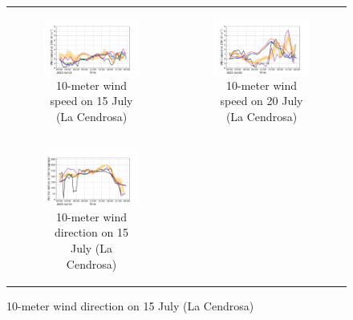 \begin{figure}[hbtp]
\begin{tabular}{cc}
        \begin{subfigure}[t]{0.5\textwidth}
            \caption{10-meter wind speed on 15 July (La Cendrosa)}
            \includegraphics[width=\textwidth]{images/chap5/IOP_TS/TS_2021-07-15_cendrosa_wind_speed_10m.png}
        \end{subfigure} &
        \begin{subfigure}[t]{0.5\textwidth}
            \caption{10-meter wind speed on 20 July (La Cendrosa)}
            \includegraphics[width=\textwidth]{images/chap5/IOP_TS/TS_2021-07-20_cendrosa_wind_speed_10m.png}
        \end{subfigure} \\
        \begin{subfigure}[t]{0.5\textwidth}
            \caption{10-meter wind direction on 15 July (La Cendrosa)}
            \includegraphics[width=\textwidth]{images/chap5/IOP_TS/TS_2021-07-15_cendrosa_wind_direction_10m.png}

\end{subfigure}
\end{tabular}
\end{figure}
